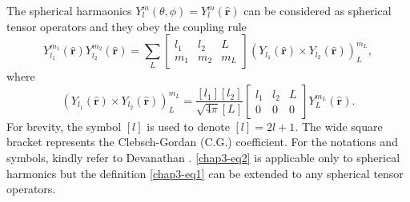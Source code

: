 The spherical harmaonics $Y^m_l(\theta, \phi)= Y_l^m (\hat{{\boldsymbol  r}})$ can be considered as spherical tensor operators and they obey the coupling rule
\begin{equation}
Y_{l_1}^{m_1} (\hat{{\boldsymbol  r}}) Y_{l_2}^{m_2} (\hat{{\boldsymbol  r}}) = \sum_L 
	\begin{bmatrix}
		l_1 & l_2 & L\\
		m_1 &m_2  & m_L
	\end{bmatrix}
(Y_{l_1} (\hat{{\boldsymbol  r}}) \times Y_{l_2} (\hat{{\boldsymbol  r}}))^{m_L}_{L}, \label{chap3-eq1}
\end{equation}
where
\begin{equation}
(Y_{l_1}  (\hat{{\boldsymbol  r}})  \times Y_{l_2} (\hat{{\boldsymbol  r}}) )^{m_L}_{L} = \frac{[l_1][l_2]}{\sqrt{4\pi}[L]}
\begin{bmatrix}
l_1 & l_2 & L\\
0 & 0 & 0
\end{bmatrix}
Y_{L}^{m_L} (\hat{{\boldsymbol  r}}). \label{chap3-eq2} 
\end{equation}
For brevity, the symbol $[l]$ is used to denote $[l] = 2l + 1$. The wide square bracket represents the Clebsch-Gordan (C.G.) coefficient. For the notations and symbols, kindly refer to Devanathan \cite{chap3-key11,chap3-key12}. \eqref{chap3-eq2} is applicable only to spherical harmonics but the definition \eqref{chap3-eq1} can be extended to any spherical tensor operators.

